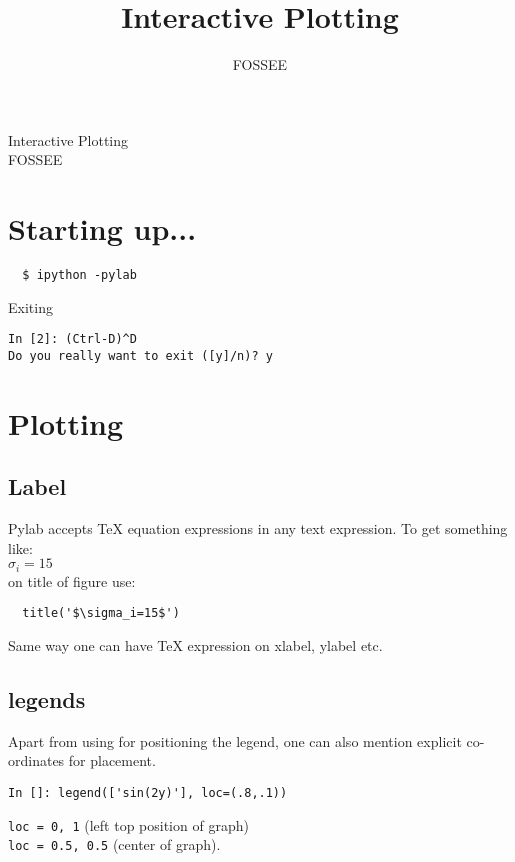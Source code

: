 \documentclass[12pt]{article}
\title{Interactive Plotting}
\author{FOSSEE}
\newcommand{\typ}[1]{\lstinline{#1}}
\begin{document}
\date{}
\vspace{-1in}
\begin{center}
\LARGE{Interactive Plotting}\\
\large{FOSSEE}
\end{center}
\section{Starting up...}

\begin{lstlisting}
  $ ipython -pylab  
\end{lstlisting}
Exiting 
\begin{lstlisting}     
In [2]: (Ctrl-D)^D
Do you really want to exit ([y]/n)? y
\end{lstlisting} %

\section{Plotting}

\subsection{Label}
Pylab accepts TeX equation expressions in any text expression. To get something like:\\
$\sigma_i=15$ \\
on title of figure use: 
\begin{lstlisting}
  title('$\sigma_i=15$')
\end{lstlisting}  
Same way one can have TeX expression on xlabel, ylabel etc.

\subsection{legends}
Apart from using  for positioning the legend, one can also mention explicit co-ordinates for placement. 
\begin{lstlisting}
In []: legend(['sin(2y)'], loc=(.8,.1)) 
\end{lstlisting}
\typ{loc = 0, 1} (left top position of graph)\\
\typ{loc = 0.5, 0.5} (center of graph).

\end{document}
